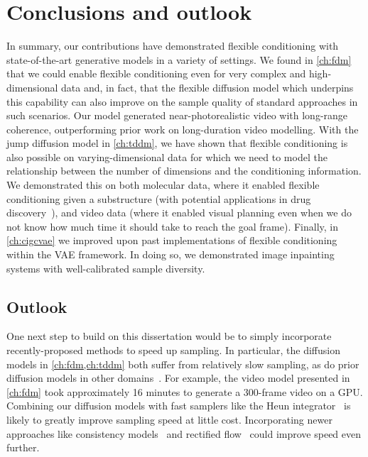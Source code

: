 \chapter{Conclusions and outlook}  \label{ch:conclusion}

In summary, our contributions have demonstrated flexible conditioning with state-of-the-art generative models in a variety of settings.
%
%
We found in \cref{ch:fdm} that we could enable flexible conditioning even for very complex and high-dimensional data and, in fact, that the flexible diffusion model which underpins this capability can also improve on the sample quality of standard approaches in such scenarios. Our model generated near-photorealistic video with long-range coherence, outperforming prior work on long-duration video modelling.
%
With the jump diffusion model in \cref{ch:tddm}, we have shown that flexible conditioning is also possible on varying-dimensional data for which we need to model the relationship between the number of dimensions and the conditioning information. We demonstrated this on both molecular data, where it enabled flexible conditioning given a substructure (with potential applications in drug discovery~\citep{hoogeboom2022equivariant}), and video data (where it enabled visual planning even when we do not know how much time it should take to reach the goal frame).
%
Finally, in \cref{ch:cigcvae} we improved upon past implementations of flexible conditioning within the VAE framework. In doing so, we demonstrated image inpainting systems with well-calibrated sample diversity.


\section*{Outlook}

One next step to build on this dissertation would be to simply incorporate recently-proposed methods to speed up sampling. In particular, the diffusion models in \cref{ch:fdm,ch:tddm} both suffer from relatively slow sampling, as do prior diffusion models in other domains~\citep{ho2020denoising,song2020score}. For example, the video model presented in \cref{ch:fdm} took approximately 16 minutes to generate a 300-frame video on a GPU.  Combining our diffusion models with fast samplers like the Heun integrator~\citep{karras2022elucidating} is likely to greatly improve sampling speed at little cost. Incorporating newer approaches like consistency models~\citep{song2023consistency} and rectified flow~\citep{esser2024scaling} could improve speed even further. 


